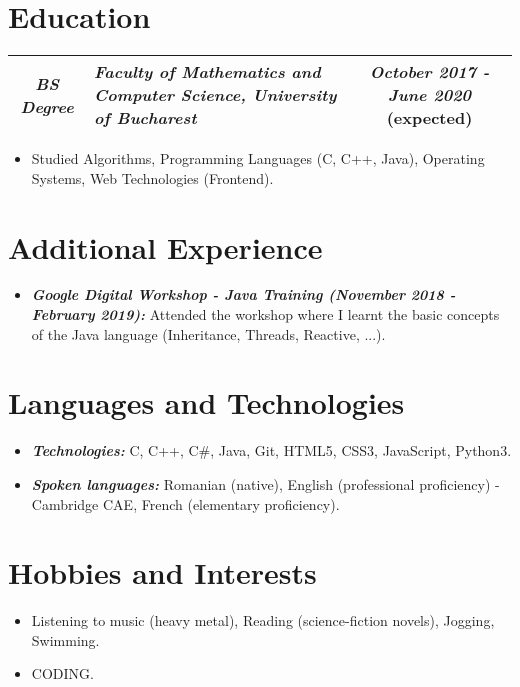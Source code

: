 \documentclass[11px]{article}
\begin{document}
    \section*{Education}
        \begin{tabular} {cC{8cm}c}
            \small\textit{\textbf{BS Degree}} 
            & \small\textit{\textbf{Faculty of Mathematics and Computer Science, University of Bucharest}} 
            & \small\textit{\textbf{October 2017 - June 2020}} (expected)\\
            \hline
        \end{tabular}

        \begin{itemize}
            \item Studied Algorithms, Programming Languages (C, C++, Java), Operating Systems, Web Technologies (Frontend).
        \end{itemize}
    
    \section*{Additional Experience}
        \begin{itemize}
            \item \textbf{\textit{Google Digital Workshop - Java Training (November 2018 - February 2019):}} Attended the workshop where I learnt the basic concepts of the Java language (Inheritance, Threads, Reactive, ...). 
        \end{itemize}
    
    \section*{Languages and Technologies}
        \begin{itemize}
            \item \textbf{\textit{Technologies:}} C, C++, C\#, Java, Git, HTML5, CSS3, JavaScript, Python3.
            \item \textbf{\textit{Spoken languages:}} Romanian (native), English (professional proficiency) - Cambridge CAE, French (elementary proficiency).
        \end{itemize}
    
    \section*{Hobbies and Interests}
        \begin{itemize}
            \item Listening to music (heavy metal), Reading (science-fiction novels), Jogging, Swimming.
            \item CODING.
        \end{itemize}
\end{document}

